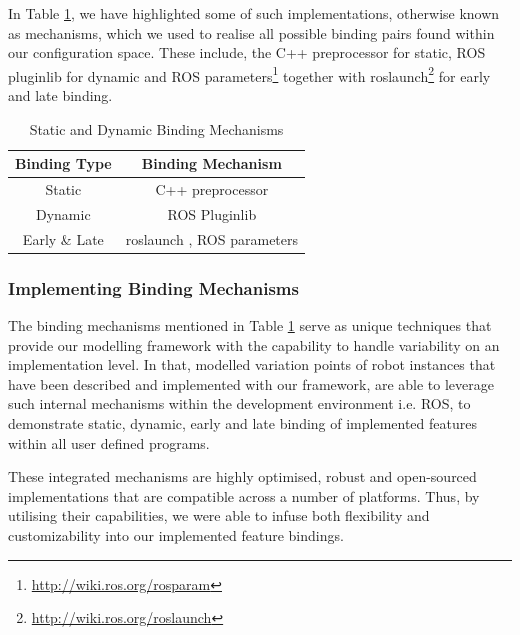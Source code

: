 \documentclass[conference]{IEEEtran}
\newcommand{\foot}[1]{\footnote{\url{#1}}}
\begin{document}
In Table \ref{tab:realmecha}, we have highlighted some of such implementations, otherwise known as mechanisms, which we used to realise all possible binding pairs found within our configuration space. These include, the C++ preprocessor for static, ROS pluginlib for dynamic and ROS parameters\foot{http://wiki.ros.org/rosparam} together with roslaunch\foot{http://wiki.ros.org/roslaunch} for early and late binding.

\begin{table}[H]
	\caption{Static and Dynamic Binding Mechanisms}
	\begin{center}
		\begin{tabular}{c c}
			\hline
			Binding Type & Binding Mechanism \\ \hline
			Static & C++ preprocessor \\ \hline
			Dynamic &  ROS Pluginlib  \\ \hline
			Early \& Late &  roslaunch , ROS parameters  \\ \hline
			
		\end{tabular}
		\label{tab:realmecha}
	\end{center}
\end{table}

\subsubsection{Implementing Binding Mechanisms}
The binding mechanisms mentioned in Table \ref{tab:realmecha} serve as unique techniques that provide our modelling framework with the capability to handle variability on an implementation level. In that, modelled variation points of robot instances that have been described and implemented with our framework, are able to leverage such internal mechanisms within the development environment i.e. ROS, to demonstrate static, dynamic, early and late binding of implemented features within all user defined programs.

These integrated mechanisms are highly optimised, robust and open-sourced implementations that are compatible across a number of platforms. Thus, by utilising their capabilities, we were able to infuse both flexibility and customizability into our implemented feature bindings.
\end{document}
